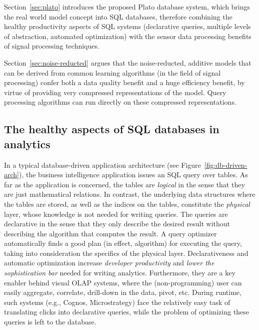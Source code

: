 
Section~\ref{sec:plato} introduces the proposed Plato database system, which brings the real world model concept into SQL databases, therefore combining the healthy productivity aspects of SQL systems (declarative queries, multiple levels of abstraction, automated optimization) with the sensor data processing benefits of signal processing techniques.

Section~\ref{sec:noise-reducted} argues that the noise-reducted, additive models that can be derived from common learning algorithms (in the field of signal processing) confer both a data quality benefit and a huge efficiency benefit, by virtue of providing very compressed representations of the model. Query processing algorithms can run directly on these compressed representations.



\subsection{The healthy aspects of SQL databases in analytics}
\label{sec:healthy-aspects}
In a typical database-driven application architecture (see Figure~\ref{fig:db-driven-arch}), the business intelligence application issues an SQL query over tables. As far as the application is concerned, the tables are {\em logical} in the sense that they are just mathematical relations. In contrast, the underlying data structures where the tables are stored, as well as the indices on the tables, constitute the {\em physical} layer, whose knowledge is not needed for writing queries. The queries are declarative in the sense that they only describe the desired result without describing the algorithm that computes the result. A query optimizer automatically finds a good plan (in effect, algorithm) for executing the query, taking into consideration the specifics of the physical layer. Declarativeness and automatic optimization increase {\em developer productivity} and {\em lower the sophistication bar} needed for writing analytics. Furthermore, they are a key enabler behind visual OLAP systems, where the (non-programming) user can easily aggregate, correlate, drill-down in the data, pivot, etc. During runtime, such systems (e.g., Cognos, Microstrategy) face the relatively easy task of translating clicks into declarative queries, while the problem of optimizing these queries is left to the database.


